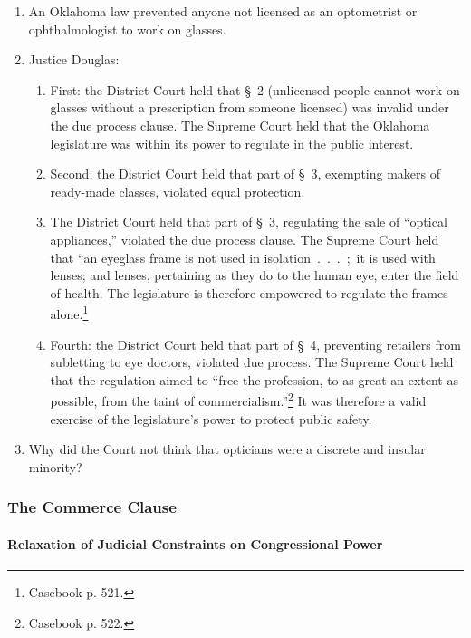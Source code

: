 \begin{enumerate}
    \item An Oklahoma law prevented anyone not licensed as an optometrist or 
    ophthalmologist to work on glasses.
    \item Justice Douglas:
    \begin{enumerate}
        \item First: the District Court held that \S\ 2 (unlicensed people 
        cannot work on glasses without a prescription from someone licensed) 
        was invalid under the due process clause. The Supreme Court held that 
        the Oklahoma legislature was within its power to regulate in the 
        public interest.
        \item Second: the District Court held that part of \S\ 3, exempting 
        makers of ready-made classes, violated equal protection.
        \item The District Court held that part of \S\ 3, regulating the sale 
        of ``optical appliances,'' violated the due process clause. The 
        Supreme Court held that ``an eyeglass frame is not used in 
        isolation~.~.~.~;~it is used with lenses; and lenses, pertaining as 
        they do to the human eye, enter the field of health. The legislature 
        is therefore empowered to regulate the frames alone.\footnote{Casebook 
        p. 521.}
        \item Fourth: the District Court held that part of \S\ 4, preventing 
        retailers from subletting to eye doctors, violated due process. The 
        Supreme Court held that the regulation aimed to ``free the profession, 
        to as great an extent as possible, from the taint of 
        commercialism.''\footnote{Casebook p. 522.} It was therefore a valid 
        exercise of the legislature's power to protect public safety.
    \end{enumerate}
    \item Why did the Court not think that opticians were a discrete and 
    insular minority?
\end{enumerate}

\subsubsection{The Commerce Clause}

\paragraph{Relaxation of Judicial Constraints on Congressional Power}

